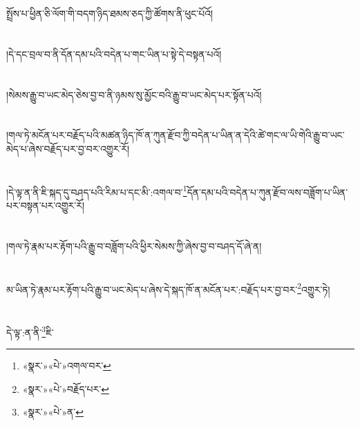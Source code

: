 { }སྤྲོས་པ་ཕྱིན་ཅི་ལོག་གི་བདག་ཉིད་ཐམས་ཅད་ཀྱི་ཚོགས་ནི་ཕུང་པོའོ།\chapter{ }།དེ་དང་བྲལ་བ་ནི་དོན་དམ་པའི་བདེན་པ་གང་ཡིན་པ་སྟེ་དེ་བསྟན་པའོ།\chapter{ }།སེམས་རྒྱུ་བ་ཡང་མེད་ཅེས་བྱ་བ་ནི་ཉམས་སུ་མྱོང་བའི་རྒྱུ་བ་ཡང་མེད་པར་སྟོན་པའོ།\chapter{ }།གལ་ཏེ་མངོན་པར་བརྗོད་པའི་མཚན་ཉིད་ཁོ་ན་ཀུན་རྫོབ་ཀྱི་བདེན་པ་ཡིན་ན་དེའི་ཚེ་གང་ལ་ཡི་གེའི་རྒྱུ་བ་ཡང་མེད་པ་ཞེས་བརྗོད་པར་བྱ་བར་འགྱུར་རོ།\chapter{ }།དེ་ལྟ་ན་ནི་ཇི་སྐད་དུ་བཤད་པའི་རིམ་པ་དང་མི་:འགལ་བ་\footnote{«སྣར་»«པེ་»འགལ་བར་}དོན་དམ་པའི་བདེན་པ་ཀུན་རྫོབ་ལས་བཟློག་པ་ཡིན་པར་བསྟན་པར་འགྱུར་རོ།\chapter{ }།གལ་ཏེ་རྣམ་པར་རྟོག་པའི་རྒྱུ་བ་བཟློག་པའི་ཕྱིར་སེམས་ཀྱི་ཞེས་བྱ་བ་བཤད་དོ་ཞེ་ན།\chapter{ }མ་ཡིན་ཏེ་རྣམ་པར་རྟོག་པའི་རྒྱུ་བ་ཡང་མེད་པ་ཞེས་དེ་སྐད་ཁོ་ན་མངོན་པར་:བརྗོད་པར་བྱ་བར་\footnote{«སྣར་»«པེ་»བརྗོད་པར་}འགྱུར་ཏེ།\chapter{ }དེ་ལྟ་:ན་ནི་\footnote{«སྣར་»«པེ་»ན་}ཇི་